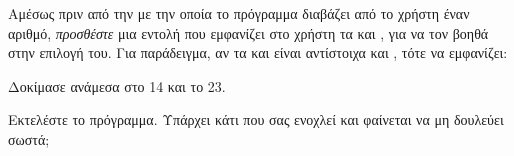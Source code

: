 \documentclass[a4paper,11pt,oneside]{book}
\begin{document}
\begin{step}
Αμέσως πριν από την  με την οποία το πρόγραμμα διαβάζει από το χρήστη έναν αριθμό, \emph{προσθέστε} μια εντολή που εμφανίζει στο χρήστη τα  και , για να τον βοηθά στην επιλογή του. Για παράδειγμα, αν τα  και  είναι αντίστοιχα  και , τότε να εμφανίζει:

\marginnote[24pt]{\iconcomputer}
\begin{pyterm}
Δοκίμασε ανάμεσα στο 14 και το 23.
\end{pyterm}

Εκτελέστε το πρόγραμμα. Υπάρχει κάτι που σας ενοχλεί και φαίνεται να μη δουλεύει σωστά;

\marginnote[14pt]{\icondiscuss}
\dottedline
\end{step}
\end{document}
